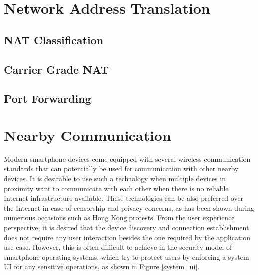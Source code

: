 \section{Network Address Translation}

\subsection{NAT Classification}





\subsection{Carrier Grade NAT}

\subsection{Port Forwarding}


\section{Nearby Communication}

Modern smartphone devices come equipped with several wireless communication standards that can potentially be used for communication with other nearby devices. It is desirable to use such a technology when multiple devices in proximity want to communicate with each other when there is no reliable Internet infrastructure available. These technologies can be also preferred over the Internet in case of censorship and privacy concerns, as has been shown during numerious occasions such as Hong Kong protests. From the user experience perspective, it is desired that the device discovery and connection establishment does not require any user interaction besides the one required by the application use case. However, this is often difficult to achieve in the security model of smartphone operating systems, which try to protect users by enforcing a system UI for any sensitive operations, as shown in Figure \ref{system_ui}.

